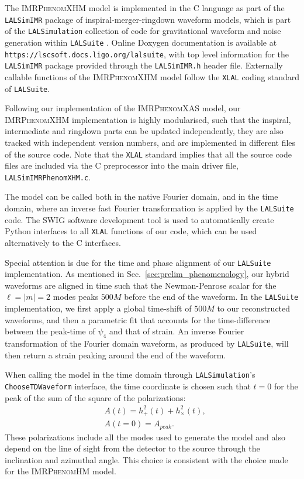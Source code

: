 \documentclass[twocolumn,prd,aps,superscriptaddress,preprintnumbers,tightenlines,showpacs,nofootinbib,eqsecnum,amsfonts,amsmath]{revtex4}
\newcommand{\phX}{\textsc{IMRPhenomXAS}\xspace}
\newcommand{\phHM}{\textsc{IMRPhenomHM}\xspace}
\newcommand{\phXHM}{\textsc{IMRPhenomXHM}\xspace}
\begin{document}
The \phXHM model is implemented in the C language as part of the
{\tt LALSimIMR} package of inspiral-merger-ringdown waveform models, which is 
part of the {\tt LALSimulation} collection of code for gravitational waveform and noise generation within \texttt{LALSuite} \cite{lalsuite}.
Online Doxygen documentation is available at {\tt https://lscsoft.docs.ligo.org/lalsuite}, with top level information 
for the {\tt LALSimIMR} package
provided through the {\tt LALSimIMR.h} header file.
%
Externally callable functions of the 
\phXHM model follow the \texttt{XLAL} coding standard of \texttt{LALSuite}.

Following our implementation of the \phX model, our \phXHM implementation is highly modularised, such that the inspiral, intermediate and ringdown parts can be updated independently, they are also tracked with independent version numbers, and are implemented in different files of the source code.
%
Note that the \texttt{XLAL} standard implies that all the source code files are included via the C preprocessor into the main driver file, 
%
{\tt LALSimIMRPhenomXHM.c}.
%

The model can be called both in the native Fourier domain, and in the time domain, where an inverse fast Fourier transformation is applied by the \texttt{LALSuite} code. The SWIG \cite{SWIG:code} software development tool is used to automatically create Python interfaces to all \texttt{XLAL} functions of our code, which can be used alternatively to the C interfaces.

Special attention is due for the time and phase alignment of our \texttt{LALSuite} implementation. As mentioned in Sec.~\ref{sec:prelim_phenomenology}, our hybrid waveforms are aligned in time such that the Newman-Penrose scalar for the $\ell=\vert m \vert = 2$ modes peaks $500 M$ before the end of the waveform. In the \texttt{LALSuite} implementation, we first apply a global time-shift of $500M$ to our reconstructed waveforms, and then a parametric fit that accounts for the time-difference between the peak-time of $\psi_4$ and that of strain. An inverse Fourier transformation of the Fourier domain waveform, as produced by \texttt{LALSuite}, will then return a strain peaking around the end of the waveform. 


When calling the model in the time domain through \texttt{LALSimulation}'s {\tt ChooseTDWaveform} interface, the time coordinate is chosen such that
$t=0$ for the peak of the sum of the square of the polarizations: 
\begin{align}
  &A(t)   = h^2_{+}(t) + h^2_{\times}(t),  \\
  &A(t=0) = A_{peak}.
\end{align}
These polarizations include all the modes used to generate the model and also depend on the line of sight from the detector to the source through the inclination and azimuthal angle. This choice is consistent with the choice made for the \phHM model.
\end{document}
